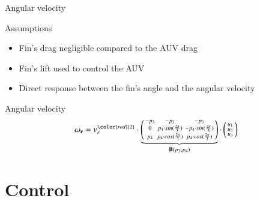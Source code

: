 \documentclass{beamer}
\begin{document}
        \begin{frame}{Angular velocity}
            \centering
            \begin{minipage}{0.8\textwidth}
                \begin{block}{Assumptions}
                    \vspace{0.2cm}
                    \begin{itemize}
                        \item Fin's drag negligible compared to the AUV drag
                        \item Fin's lift used to control the AUV
                        \item Direct response between the fin's angle and the angular velocity
                    \end{itemize}
                \end{block}
                \begin{block}{Angular velocity}
                    \begin{equation}
                        \mathbf{\omega_r} = v_r^{\color{red}{2}} \cdot 
                            \underbrace{
                                \left(
                                \begin{smallmatrix}
                                    -p_3 & -p_3 & -p_3 \\
                                    0 & p_4 \cdot sin(\frac{2\pi}{3}) & -p_4 \cdot sin(\frac{2\pi}{3}) \\
                                    p_4 & p_4 \cdot cos(\frac{2\pi}{3}) & p_4 \cdot cos(\frac{2\pi}{3})
                                \end{smallmatrix}
                                \right)
                            }_{\mathbf{B}(p_3, p_4)} \cdot \left(\begin{smallmatrix}u_1\\ u_2\\ u_3\end{smallmatrix}\right)
                    \end{equation}
                \end{block}
            \end{minipage}
        \end{frame}

    \section{Control}
\end{document}
